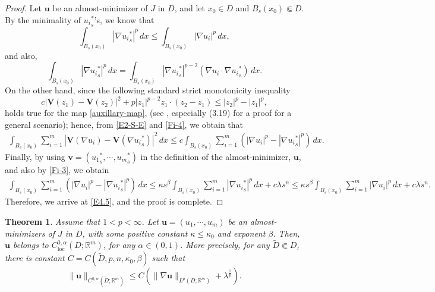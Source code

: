 \documentclass{amsart}
\newtheorem{theorem}{Theorem}[section]
\begin{document}
\begin{proof}
Let $\mathbf{u}$ be an almost-minimizer of $J$ in $D$, and let $x_0 \in D$ and $B_s(x_0) \Subset D$. 
By the minimality of ${u_i}^{*}_s$'s, we know that
\begin{equation}
\label{Fi-3}
\int_{B_s(x_0)} \left|\nabla {u_i}^{*}_s \right|^p \, dx \leq \int_{B_s(x_0)} \left|\nabla u_i \right|^p \, dx,
\end{equation}
and also,
\begin{equation}
\label{E2-S-E}
\int_{B_s(x_0)} \left| \nabla {u_i}^{*}_s \right|^p   \,dx = \int_{B_s(x_0)} \left|\nabla {u_i}^{*}_s \right|^{p-2} \left( \nabla u_i \cdot \nabla {u_i}^{*}_s \right)  \, dx.
\end{equation}
On the other hand, since the following standard strict monotonicity inequality
\begin{equation}
\label{Fi-4}
c \left|\mathbf{V}(z_1)-\mathbf{V}(z_2) \right|^2 + p  |z_1|^{p-2} z_1 \cdot (z_2-z_1) \leq   |z_2|^p-|z_1|^p,
\end{equation}
holds true for the map \eqref{auxillary-map}, (see \cite[Section 3.3]{de2023nonuniformly}, especially (3.19) for a  proof for a general scenario);
hence, from \eqref{E2-S-E} and \eqref{Fi-4}, we obtain that 
$$
\begin{aligned}
\int_{B_s(x_0)} \sum_{i=1}^{m} \left|\mathbf{V}(\nabla u_i)-\mathbf{V}(\nabla {u_i}^{*}_s) \right|^2 \, dx \leq  c \int_{B_s(x_0)} \sum_{i=1}^{m} \left( \left|\nabla u_i \right|^p-\left|\nabla {u_i}^{*}_s \right|^p \right) \, dx.
\end{aligned}
$$
Finally, by using $\mathbf{v}=({u_1}^{*}_s, \cdots, {u_m}^{*}_s)$ in the definition of the almost-minimizer, $\mathbf{u}$, and also by \eqref{Fi-3}, we obtain  
$$ 
\begin{aligned}
 \int_{B_s(x_0)} \sum_{i=1}^{m} \left( \left|\nabla u_i \right|^p- \left|\nabla {u_i}^{*}_s \right|^p \right) \, dx %
 \leq \kappa s^{\beta} \int_{B_s(x_0)} \sum_{i=1}^{m} \left|\nabla {u_i}^{*}_s \right|^p \, dx + c \lambda s^n %
\leq \kappa s^{\beta} \int_{B_{s}(x_0)} \sum_{i=1}^{m} |\nabla u_i |^p \, dx + c \lambda s^n. 
\end{aligned}
$$
Therefore, 
we arrive  at \eqref{E4.5}, and the proof is complete.
\end{proof}


\begin{theorem}
\label{T3}
Assume that $1<p<\infty$. 
Let $\mathbf{u}=(u_1,\cdots,u_m)$ be an almost-minimizers of $J$ in $D$, with some positive constant $\kappa \le \kappa_0$ and exponent $\beta$. 
Then, $\mathbf{u}$ belongs to $C_{\mathrm{loc}}^{0,\alpha} \left(D; \mathbb{R}^m \right)$, for any $\alpha \in (0,1)$. More precisely, for any $\tilde{D} \Subset D$, there is constant $C=C(\tilde D,  p, n, \kappa_0, \beta)$ such that
$$ \|\mathbf{u}\|_{C^{0,\alpha}(\tilde{D}; \mathbb{R}^m)}\leq C\left(\|\nabla \mathbf{u}\|_{L^{p}(D; \mathbb{R}^m)}+\lambda^{\frac{1}{p}} \right). $$ 
\end{theorem}
\end{document}
